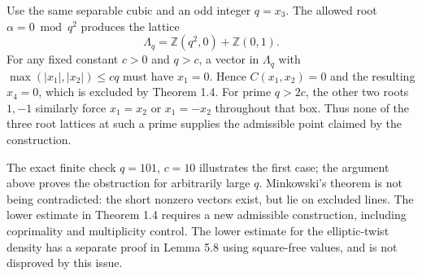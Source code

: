 \documentclass[10pt]{article}
\begin{document}
Use the same separable cubic and an odd integer \(q=x_3\). The allowed root \(\alpha=0\bmod q^2\) produces the lattice \[\Lambda_q=\mathbb Z(q^2,0)+\mathbb Z(0,1).\] For any fixed constant \(c>0\) and \(q>c\), a vector in \(\Lambda_q\) with \(\max(|x_1|,|x_2|)\leq cq\) must have \(x_1=0\). Hence \(C(x_1,x_2)=0\) and the resulting \(x_4=0\), which is excluded by Theorem 1.4. For prime \(q>2c\), the other two roots \(1,-1\) similarly force \(x_1=x_2\) or \(x_1=-x_2\) throughout that box. Thus none of the three root lattices at such a prime supplies the admissible point claimed by the construction.\par
The exact finite check \(q=101\), \(c=10\) illustrates the first case; the argument above proves the obstruction for arbitrarily large \(q\). Minkowski’s theorem is not being contradicted: the short nonzero vectors exist, but lie on excluded lines. The lower estimate in Theorem 1.4 requires a new admissible construction, including coprimality and multiplicity control. The lower estimate for the elliptic-twist density has a separate proof in Lemma 5.8 using square-free values, and is not disproved by this issue.\par
\end{document}

